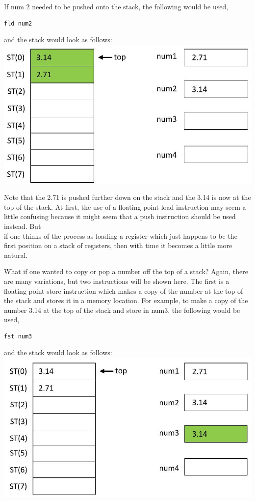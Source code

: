 \documentclass[10pt]{article}
\begin{document}
If num 2 needed to be pushed onto the stack, the following would be used,

\begin{verbatim}
fld num2
\end{verbatim}

and the stack would look as follows:\\
\includegraphics[max width=\textwidth, center]{2025_03_24_ebe50cc223a6fbc49eecg-222(1)}

Note that the 2.71 is pushed further down on the stack and the 3.14 is now at the top of the stack. At first, the use of a floating-point load instruction may seem a little confusing because it might seem that a push instruction should be used instead. But\\
if one thinks of the process as loading a register which just happens to be the first position on a stack of registers, then with time it becomes a little more natural.

What if one wanted to copy or pop a number off the top of a stack? Again, there are many variations, but two instructions will be shown here. The first is a floating-point store instruction which makes a copy of the number at the top of the stack and stores it in a memory location. For example, to make a copy of the number 3.14 at the top of the stack and store in num3, the following would be used,

\begin{verbatim}
fst num3
\end{verbatim}

and the stack would look as follows:\\
\includegraphics[max width=\textwidth, center]{2025_03_24_ebe50cc223a6fbc49eecg-223}
\end{document}
